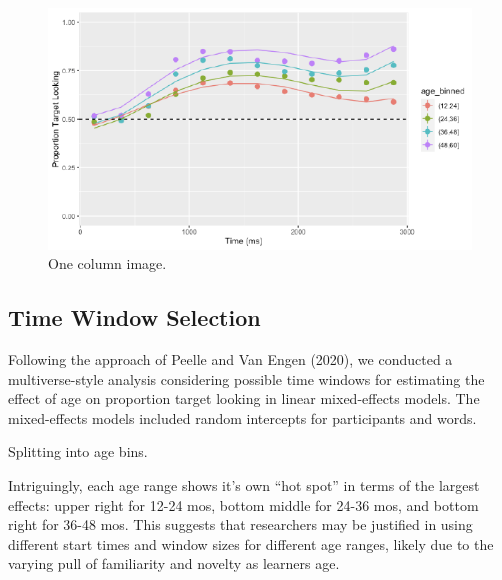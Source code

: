 \documentclass[10pt, letterpaper]{article}
\newenvironment{CodeChunk}{}{}
\begin{document}
\begin{CodeChunk}
\begin{figure}[H]

{\centering \includegraphics{figs/age_gca-1} 

}

\caption[One column image]{One column image.}\label{fig:age_gca}
\end{figure}
\end{CodeChunk}

\hypertarget{time-window-selection}{%
\subsection{Time Window Selection}\label{time-window-selection}}

Following the approach of Peelle and Van Engen (2020), we conducted a
multiverse-style analysis considering possible time windows for
estimating the effect of age on proportion target looking in linear
mixed-effects models. The mixed-effects models included random
intercepts for participants and words.

Splitting into age bins.

Intriguingly, each age range shows it's own ``hot spot'' in terms of the
largest effects: upper right for 12-24 mos, bottom middle for 24-36 mos,
and bottom right for 36-48 mos. This suggests that researchers may be
justified in using different start times and window sizes for different
age ranges, likely due to the varying pull of familiarity and novelty as
learners age.
\end{document}
